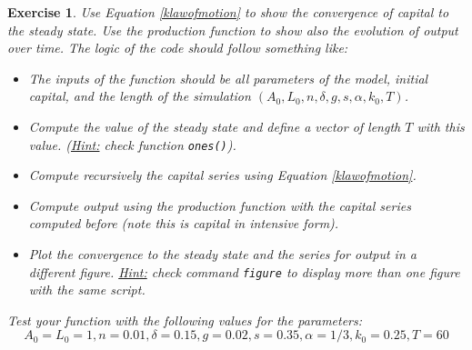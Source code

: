 \documentclass[a4paper,12pt]{article}
\newtheorem{exercise}{Exercise}
\begin{document}
\begin{exercise}
	 Use Equation \eqref{klawofmotion} to show the convergence of capital to the steady state. Use the production function to show also the evolution of output over time. The logic of the code should follow something like:
	 \begin{itemize}
	 	\item The inputs of the function should be all parameters of the model, initial capital, and the length of the simulation $(A_0, L_0, n, \delta, g, s, \alpha, k_0, T)$.
	 	\item Compute the value of the steady state and define a vector of length $T$ with this value. (\textit{\underline{Hint:} check function} \texttt{ones()}).
	 	\item Compute recursively the capital series using Equation \eqref{klawofmotion}.
	 	\item Compute output using the production function with the capital series computed before (note this is capital in intensive form).
	 	\item Plot the convergence to the steady state and the series for output in a different figure. \underline{Hint:} check command \texttt{figure} to display more than one figure with the same script.
	 \end{itemize}
	 Test your function with the following values for the parameters:
	\[
	 A_0 = L_0 = 1, n = 0.01, \delta = 0.15, g = 0.02, s = 0.35, \alpha = 1/3, k_0 = 0.25, T = 60
	 \]
\end{exercise}
\end{document}
